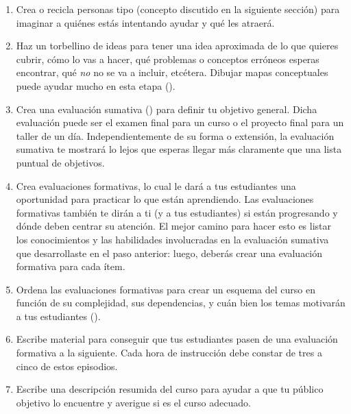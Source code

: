 \begin{enumerate}
 
\item
Crea o recicla personas tipo (concepto discutido en la siguiente sección)
para imaginar a quiénes estás intentando ayudar y qué les atraerá.

 \item
Haz un torbellino de ideas para tener una idea aproximada de lo que quieres cubrir,
cómo lo vas a hacer,
qué problemas o conceptos erróneos esperas encontrar,
qué \emph{no} no se va a incluir, etcétera.
Dibujar mapas conceptuales puede ayudar mucho en esta etapa ().
 
\item
Crea una evaluación sumativa ()
para definir tu objetivo general.
Dicha evaluación puede ser el examen final para un curso
o el proyecto final para un taller de un día.
Independientemente de su forma o extensión,
la evaluación sumativa te mostrará lo lejos que esperas llegar
más claramente que una lista puntual de objetivos.
 
\item
Crea evaluaciones formativas,
lo cual le dará a tus estudiantes una oportunidad para practicar lo que están aprendiendo.
Las evaluaciones formativas también te dirán a ti (y a tus estudiantes) si están progresando
y dónde deben centrar su atención.
El mejor camino para hacer esto es listar los conocimientos y las habilidades
involucradas en la evaluación sumativa que desarrollaste en el paso anterior: luego, deberás crear una evaluación formativa para cada ítem.
 
\item
Ordena las evaluaciones formativas para crear un esquema del curso
en función de su complejidad,
sus dependencias,
y cuán bien los temas motivarán a tus estudiantes ().
 
\item
Escribe material para conseguir que tus estudiantes pasen de una evaluación formativa a la siguiente.
Cada hora de instrucción debe constar de tres a cinco de estos episodios.
 
\item
Escribe una descripción resumida del curso
para ayudar a que tu público objetivo lo encuentre
y averigue si es el curso adecuado.
 \end{enumerate}
 
